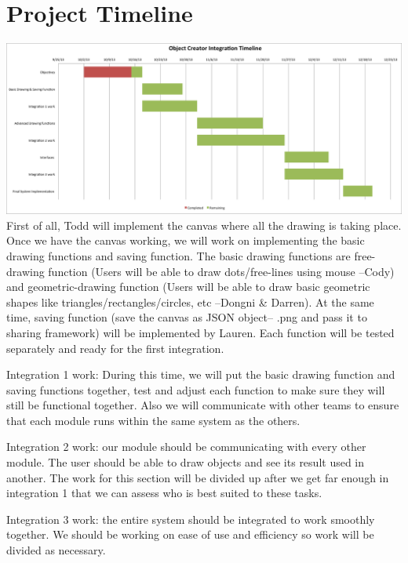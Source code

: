 \documentclass[a4paper, 11pt]{article} %
\begin{document}

\section*{Project Timeline}

\includegraphics[scale=0.33]{Timeline}\\

First of all, Todd will implement the canvas where all the drawing is taking place. Once we have the canvas working, we will work on implementing the basic drawing functions and saving function. The basic drawing functions are free-drawing function (Users will be able to draw dots/free-lines using mouse --Cody) and geometric-drawing function (Users will be able to draw basic geometric shapes like triangles/rectangles/circles, etc --Dongni & Darren). At the same time, saving function (save the canvas as JSON object-- .png and pass it to sharing framework) will be implemented by Lauren. Each function will be tested separately and ready for the first integration.

Integration 1 work:
During this time,  we will put  the basic drawing function and saving functions together, test and adjust each function to make sure they will still be functional together. Also we will communicate with other teams to ensure that each module runs within the same system as the others.

Integration 2 work: our module should be communicating with every other module. The user should be able to draw objects  and see its result used in another. The work for this section will be divided up after we get far enough in integration 1 that we can assess who is best suited to these tasks.

Integration 3 work: the entire system should be integrated to work smoothly together. We should be working on ease of use and efficiency so work will be divided as necessary.
\end{document}
